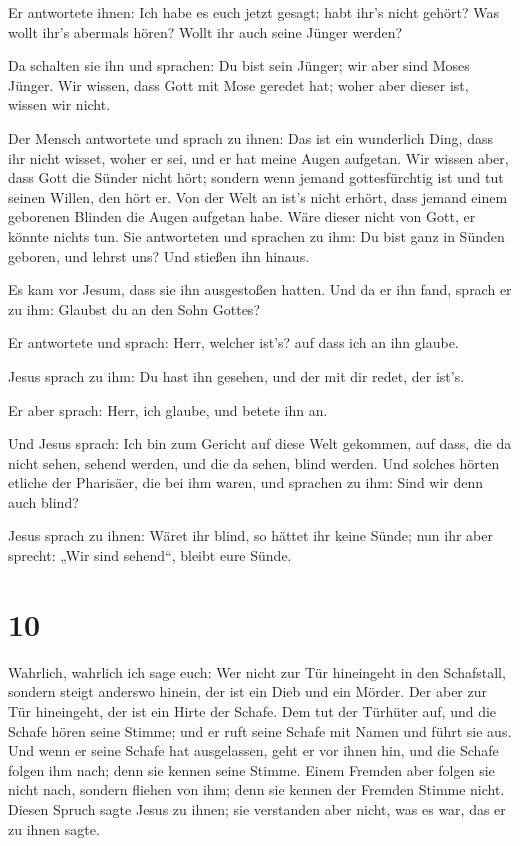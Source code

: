  Er antwortete ihnen: Ich habe es euch jetzt gesagt; habt
ihr's nicht gehört? Was wollt ihr's abermals hören? Wollt ihr auch seine
Jünger werden?

 Da schalten sie ihn und sprachen: Du bist sein Jünger;
wir aber sind Moses Jünger.  Wir wissen, dass Gott mit
Mose geredet hat; woher aber dieser ist, wissen wir nicht.

 Der Mensch antwortete und sprach zu ihnen: Das ist ein
wunderlich Ding, dass ihr nicht wisset, woher er sei, und er hat meine
Augen aufgetan.  Wir wissen aber, dass Gott die Sünder
nicht hört; sondern wenn jemand gottesfürchtig ist und tut seinen
Willen, den hört er.  Von der Welt an ist's nicht erhört,
dass jemand einem geborenen Blinden die Augen aufgetan habe.
 Wäre dieser nicht von Gott, er könnte nichts tun.
 Sie antworteten und sprachen zu ihm: Du bist ganz in
Sünden geboren, und lehrst uns? Und stießen ihn hinaus.

 Es kam vor Jesum, dass sie ihn ausgestoßen hatten. Und
da er ihn fand, sprach er zu ihm: Glaubst du an den Sohn Gottes?

 Er antwortete und sprach: Herr, welcher ist's? auf dass
ich an ihn glaube.

 Jesus sprach zu ihm: Du hast ihn gesehen, und der mit
dir redet, der ist's.

 Er aber sprach: Herr, ich glaube, und betete ihn an.

 Und Jesus sprach: Ich bin zum Gericht auf diese Welt
gekommen, auf dass, die da nicht sehen, sehend werden, und die da sehen,
blind werden.  Und solches hörten etliche der Pharisäer,
die bei ihm waren, und sprachen zu ihm: Sind wir denn auch blind?

 Jesus sprach zu ihnen: Wäret ihr blind, so hättet ihr
keine Sünde; nun ihr aber sprecht: „Wir sind sehend``, bleibt eure
Sünde.

\hypertarget{section-9}{%
\section{10}\label{section-9}}

 Wahrlich, wahrlich ich sage euch: Wer nicht zur Tür
hineingeht in den Schafstall, sondern steigt anderswo hinein, der ist
ein Dieb und ein Mörder.  Der aber zur Tür hineingeht, der
ist ein Hirte der Schafe.  Dem tut der Türhüter auf, und
die Schafe hören seine Stimme; und er ruft seine Schafe mit Namen und
führt sie aus.  Und wenn er seine Schafe hat ausgelassen,
geht er vor ihnen hin, und die Schafe folgen ihm nach; denn sie kennen
seine Stimme.  Einem Fremden aber folgen sie nicht nach,
sondern fliehen von ihm; denn sie kennen der Fremden Stimme nicht.
 Diesen Spruch sagte Jesus zu ihnen; sie verstanden aber
nicht, was es war, das er zu ihnen sagte.

